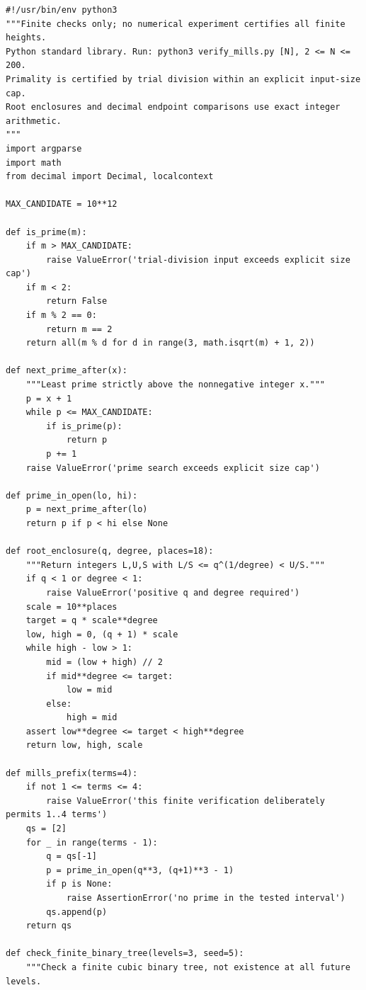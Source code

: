 \documentclass[11pt,reqno]{amsart}
\theoremstyle{blueplain}
\newcounter{asser}
\numberwithin{equation}{section}
\begin{document}
\begin{lstlisting}[style=python,basicstyle=\ttfamily\scriptsize,numberstyle=\scriptsize]
#!/usr/bin/env python3
"""Finite checks only; no numerical experiment certifies all finite heights.
Python standard library. Run: python3 verify_mills.py [N], 2 <= N <= 200.
Primality is certified by trial division within an explicit input-size cap.
Root enclosures and decimal endpoint comparisons use exact integer arithmetic.
"""
import argparse
import math
from decimal import Decimal, localcontext

MAX_CANDIDATE = 10**12

def is_prime(m):
    if m > MAX_CANDIDATE:
        raise ValueError('trial-division input exceeds explicit size cap')
    if m < 2:
        return False
    if m % 2 == 0:
        return m == 2
    return all(m % d for d in range(3, math.isqrt(m) + 1, 2))

def next_prime_after(x):
    """Least prime strictly above the nonnegative integer x."""
    p = x + 1
    while p <= MAX_CANDIDATE:
        if is_prime(p):
            return p
        p += 1
    raise ValueError('prime search exceeds explicit size cap')

def prime_in_open(lo, hi):
    p = next_prime_after(lo)
    return p if p < hi else None

def root_enclosure(q, degree, places=18):
    """Return integers L,U,S with L/S <= q^(1/degree) < U/S."""
    if q < 1 or degree < 1:
        raise ValueError('positive q and degree required')
    scale = 10**places
    target = q * scale**degree
    low, high = 0, (q + 1) * scale
    while high - low > 1:
        mid = (low + high) // 2
        if mid**degree <= target:
            low = mid
        else:
            high = mid
    assert low**degree <= target < high**degree
    return low, high, scale

def mills_prefix(terms=4):
    if not 1 <= terms <= 4:
        raise ValueError('this finite verification deliberately permits 1..4 terms')
    qs = [2]
    for _ in range(terms - 1):
        q = qs[-1]
        p = prime_in_open(q**3, (q+1)**3 - 1)
        if p is None:
            raise AssertionError('no prime in the tested interval')
        qs.append(p)
    return qs

def check_finite_binary_tree(levels=3, seed=5):
    """Check a finite cubic binary tree, not existence at all future levels.


\end{lstlisting}
\end{document}
